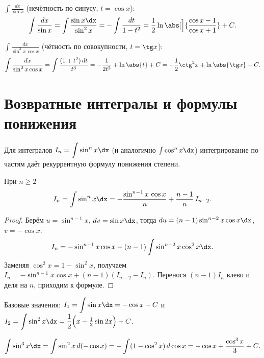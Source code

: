 \begin{example}
$\displaystyle\int\frac{dx}{\sin x}$ (нечётность по синусу, $t=\cos x$):
\[
  \int\frac{dx}{\sin x}=\int\frac{\sin x\dx}{\sin^2 x}=-\int\frac{dt}{1-t^2}
   =\frac12\ln\abs[\Big]{\frac{\cos x-1}{\cos x+1}}+C .
\]
\end{example}

\begin{example}
$\displaystyle\int\frac{dx}{\sin^3 x\,\cos x}$ (чётность по совокупности, $t=\tg x$):
\[
  \int\frac{dx}{\sin^3 x\cos x}=\int\frac{(1+t^2)\,dt}{t^3}
   =-\frac{1}{2t^2}+\ln\abs{t}+C
   =-\frac12\ctg^2 x+\ln\abs{\tg x}+C .
\]
\end{example}

\section{Возвратные интегралы и формулы понижения}

Для интегралов $\displaystyle I_n=\int\sin^n x\dx$ (и аналогично $\int\cos^n x\dx$) интегрирование
по частям даёт рекуррентную формулу понижения степени.

\begin{theorem}
При $n\ge2$
\[
  I_n=\int\sin^n x\dx=-\frac{\sin^{n-1}x\,\cos x}{n}+\frac{n-1}{n}\,I_{n-2}.
\]
\end{theorem}

\begin{proof}
Берём $u=\sin^{n-1}x$, $dv=\sin x\dx$, тогда $du=(n-1)\sin^{n-2}x\cos x\dx$, $v=-\cos x$:
\[
  I_n=-\sin^{n-1}x\cos x+(n-1)\int\sin^{n-2}x\cos^2 x\dx .
\]
Заменяя $\cos^2 x=1-\sin^2 x$, получаем
$I_n=-\sin^{n-1}x\cos x+(n-1)(I_{n-2}-I_n)$. Перенося $(n-1)I_n$ влево и деля на $n$, приходим к
формуле.
\end{proof}

\noindent Базовые значения: $I_1=\displaystyle\int\sin x\dx=-\cos x+C$ и
$I_2=\displaystyle\int\sin^2 x\dx=\frac12\Bigl(x-\tfrac12\sin 2x\Bigr)+C$.

\begin{example}
$\displaystyle\int\sin^3 x\dx=\int\sin^2 x\,d(-\cos x)=-\int(1-\cos^2 x)\,d\cos x
 =-\cos x+\frac{\cos^3 x}{3}+C.$
\end{example}
